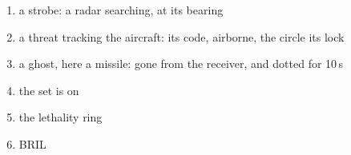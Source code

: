 \begin{enumerate}[label=\textbf{\arabic*},leftmargin=*,itemsep=0pt]
\item a strobe: a radar searching, at its bearing
\item a threat tracking the aircraft: its code, airborne, the circle its lock
\item a ghost, here a missile: gone from the receiver, and dotted for 10\,s
\item the set is on
\item the lethality ring
\item BRIL
\end{enumerate}
